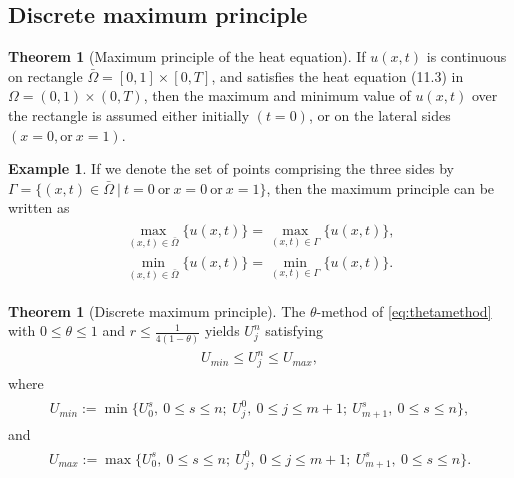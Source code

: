 \documentclass[a4paper,twoside]{ctexart}
\theoremstyle{definition}
\newtheorem{example}[definition]{Example}
\newtheorem{theorem}[definition]{Theorem}
\begin{document}
\subsection{Discrete maximum principle}
\begin{theorem}[Maximum principle of the heat equation]
	If $u(x,t)$ is continuous on rectangle $\bar{\Omega} = [0,1]\times[0,T]$, and satisfies the heat equation (11.3) in $\Omega = (0,1) \times (0,T)$, then the maximum and minimum value of $u(x,t)$ over the rectangle is assumed either initially
	$(t = 0)$, or on the lateral sides $(x = 0, \text{or}\ x = 1)$.
\end{theorem}
\begin{example}
	If we denote the set of points comprising the three sides by $\Gamma = \{(x, t) \in \bar{\Omega}\ |\ t = 0 \ \text{or}\ x = 0\ \text{or}\ x = 1\}$, then the maximum principle can be written as
	\begin{eqnarray}
	\begin{aligned}
	\max_{(x,t) \in \bar{\Omega}}\{u(x,t)\} = \max_{(x,t) \in \Gamma}\{u(x,t)\},\\
	\min_{(x,t) \in \bar{\Omega}}\{u(x,t)\} = \min_{(x,t) \in \Gamma}\{u(x,t)\}.
	\end{aligned}
	\end{eqnarray}
\end{example}
\begin{theorem}[Discrete maximum principle]
	The $\theta$-method of \eqref{eq:thetamethod} with $0 \le \theta \le 1$ and $r \le \frac{1}{4(1 − \theta)} $ yields $U_j^n$ satisfying
		\begin{eqnarray}
	\label{eq:dismaxprcp}
	\begin{aligned}
	U_{min} \le U_j^n \le U_{max},
	\end{aligned}
	\end{eqnarray}
	where 
		\begin{eqnarray}
	\label{eq:Umin}
	\begin{aligned}
	U_{min} := \min{\{U_0^s,\ 0 \le s \le n;\ U_j^0,\ 0 \le j \le m+1; \ U_{m+1}^s,\ 0 \le s \le n\}},
	\end{aligned}
	\end{eqnarray}
	and
		\begin{eqnarray}
	\label{eq:Umax}
	\begin{aligned}
	U_{max} := \max{\{U_0^s,\ 0 \le s \le n;\ U_j^0,\ 0 \le j \le m+1; \ U_{m+1}^s,\ 0 \le s \le n\}}.
	\end{aligned}
	\end{eqnarray}
\end{theorem}
\end{document}
